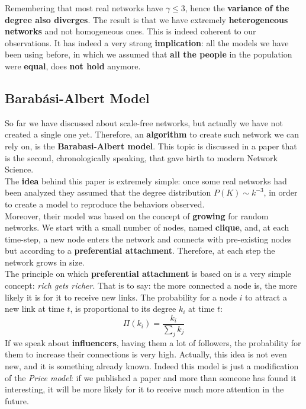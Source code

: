 \documentclass[../main/main.tex]{subfiles}
\begin{document}
Remembering that most real networks have \( \gamma \le 3 \), hence the \textbf{variance of the degree also diverges}. The result is that we have extremely \textbf{heterogeneous networks} and not homogeneous ones. This is indeed coherent to our observations. 
It has indeed a very strong \textbf{implication}: all the models we have been using before, in which we assumed that \textbf{all the people} in the population were \textbf{equal}, does \textbf{not hold} anymore.

\subsection{Barabási-Albert Model}
So far we have discussed about scale-free networks, but actually we have not created a single one yet. Therefore, an \textbf{algorithm} to create such network we can rely on, is the \textbf{Barabasi-Albert model}. This topic is discussed in a paper that is the second, chronologically speaking, that gave birth to modern Network Science. \\
The \textbf{idea} behind this paper is extremely simple: once some real networks had been analyzed they assumed that the degree distribution \( P(K) \sim k^{-3} \), in order to create a model to reproduce the behaviors observed.\\
Moreover, their model was based on the concept of \textbf{growing} for random networks. We start with a small number of nodes, named \textbf{clique}, and, at each time-step, a new node enters the network and connects with pre-existing nodes but according to a \textbf{preferential attachment}. Therefore, at each step the network grows in size.\\
The principle on which \textbf{preferential attachment} is based on is a very simple concept: \textit{rich gets richer}. That is to say: the more connected a node is, the more likely it is for it to receive new links. The probability for a node $i$ to attract a new link at time $t$, is proportional to its degree $k_i$ at time $t$:
\begin{equation}
  \Pi (k_i) = \frac{k_i}{\sum_{j}^{} k_j }
\end{equation}
If we speak about \textbf{influencers}, having them a lot of followers, the probability for them to increase their connections is very high. Actually, this idea is not even new, and it is something already known. Indeed this model is just a modification of the \textit{Price model}: if we published a paper and more than someone has found it interesting, it will be more likely for it to receive much more attention in the future.\\
\end{document}
